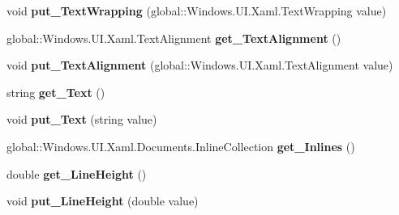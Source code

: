 \begin{DoxyCompactItemize}
void {\bfseries put\+\_\+\+Text\+Wrapping} (global\+::\+Windows.\+U\+I.\+Xaml.\+Text\+Wrapping value)
\item 
\mbox{\label{class_windows_1_1_u_i_1_1_xaml_1_1_controls_1_1_text_block_ac6b29ca491dedd9ebb342072b1916a79}} 
global\+::\+Windows.\+U\+I.\+Xaml.\+Text\+Alignment {\bfseries get\+\_\+\+Text\+Alignment} ()
\item 
\mbox{\label{class_windows_1_1_u_i_1_1_xaml_1_1_controls_1_1_text_block_a284f18b28cc583c43ba5d9187d561ef7}} 
void {\bfseries put\+\_\+\+Text\+Alignment} (global\+::\+Windows.\+U\+I.\+Xaml.\+Text\+Alignment value)
\item 
\mbox{\label{class_windows_1_1_u_i_1_1_xaml_1_1_controls_1_1_text_block_ae14b2c8d9da353fd995b80695d4caad0}} 
string {\bfseries get\+\_\+\+Text} ()
\item 
\mbox{\label{class_windows_1_1_u_i_1_1_xaml_1_1_controls_1_1_text_block_aa509823085f394729f1646a2acf564c4}} 
void {\bfseries put\+\_\+\+Text} (string value)
\item 
\mbox{\label{class_windows_1_1_u_i_1_1_xaml_1_1_controls_1_1_text_block_a6b2eb2ee12b7795ff5bfb850402083d6}} 
global\+::\+Windows.\+U\+I.\+Xaml.\+Documents.\+Inline\+Collection {\bfseries get\+\_\+\+Inlines} ()
\item 
\mbox{\label{class_windows_1_1_u_i_1_1_xaml_1_1_controls_1_1_text_block_a07976cf606fca5824f633f63d8da6936}} 
double {\bfseries get\+\_\+\+Line\+Height} ()
\item 
\mbox{\label{class_windows_1_1_u_i_1_1_xaml_1_1_controls_1_1_text_block_adbefe17b425b126a3b1d3598cf3b68f4}} 
void {\bfseries put\+\_\+\+Line\+Height} (double value)
\item 
\mbox{\label{class_windows_1_1_u_i_1_1_xaml_1_1_controls_1_1_text_block_af80d81341031136a13a2687720d46da0}} 

\end{DoxyCompactItemize}
